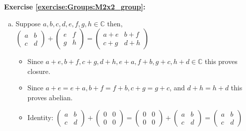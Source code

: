 \noindent\textbf{Exercise \ref{exercise:Groups:M2x2_group}:}
%
\begin{enumerate}[(a)]
\item
Suppose $a, b, c, d, e, f, g, h \in {\mathbb C}$ then, $
\begin{pmatrix}
a & b \\
c & d
\end{pmatrix} + 
\begin{pmatrix}
e & f \\
g & h
\end{pmatrix} = \begin{pmatrix}
a + e & b + f \\
c + g & d + h
\end{pmatrix}$

	\begin{itemize}
	\item
	Since $a + e, b + f, c + g, d + h, e + a, f + b, g + c, h + d \in {\mathbb C}$ this proves closure.
	
	\item
	Since $a + e =  e + a, b + f = f + b, c + g = g + c$, and $d + h = h + d$ this proves abelian.

	\item
	Identity:
	$
	\begin{pmatrix}
	a & b \\
	c & d
	\end{pmatrix} + 
	\begin{pmatrix}
	0 & 0 \\
	0 & 0
	\end{pmatrix} = \begin{pmatrix}
	0 & 0 \\
	0 & 0
	\end{pmatrix}+ 
	\begin{pmatrix}
	a & b \\
	c & d
	\end{pmatrix}  = \begin{pmatrix}
	a & b \\
	c & d
	\end{pmatrix}$
	

\end{itemize}
\end{enumerate}
